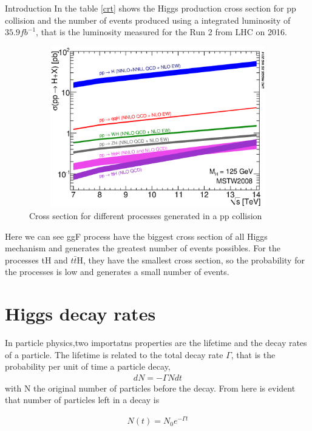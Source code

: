 \begin{chapter}{Introduction}
In the table \ref{crt} shows the Higgs production cross section for pp collision and the number of events produced using a integrated luminosity of $35.9 fb^{-1}$, that is the luminosity measured for the Run 2 from LHC on 2016\cite{pd}.

\begin{figure}
\centering
\includegraphics[width=12cm,height=7cm]{Chapter1/7-14xsec.eps}
\caption{
Cross section for different processes generated in a pp collision \protect \footnotemark }
 \label{csp}
\end{figure}

Here we can see ggF process have the biggest cross section of all Higgs mechanism and generates the greatest number of events possibles. For the processes tH and $t\bar{t}$H, they have the smallest cross section, so the probability for the processes is low and generates a small number of events. 
\pagebreak
{}
\section{Higgs decay rates}
In particle physics,two importatns properties are the lifetime and the decay rates of a particle. The lifetime is related to the total decay rate $\Gamma$, that is the probability per unit of time a particle decay, 
\begin{align}
  dN=-\Gamma N dt
\end{align}
with N the original number of particles before the decay. From here is evident that number of particles left in a decay is 

\begin{align}
N(t)=N_0 e^{-\Gamma t}
\end{align}


\end{chapter}
